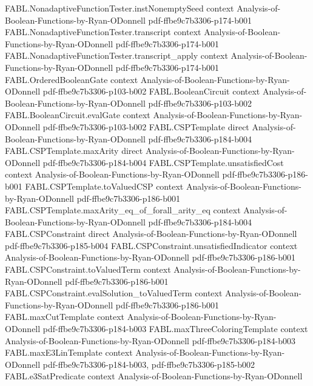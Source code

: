 \begin{theorem}
  {FABL.NonadaptiveFunctionTester.instNonemptySeed}
  {context}
  {Analysis-of-Boolean-Functions-by-Ryan-ODonnell}
  {pdf-ffbe9c7b3306-p174-b001}
\proofstep
  {FABL.NonadaptiveFunctionTester.transcript}
  {context}
  {Analysis-of-Boolean-Functions-by-Ryan-ODonnell}
  {pdf-ffbe9c7b3306-p174-b001}
\proofstep
  {FABL.NonadaptiveFunctionTester.transcript_apply}
  {context}
  {Analysis-of-Boolean-Functions-by-Ryan-ODonnell}
  {pdf-ffbe9c7b3306-p174-b001}
\proofstep
  {FABL.OrderedBooleanGate}
  {context}
  {Analysis-of-Boolean-Functions-by-Ryan-ODonnell}
  {pdf-ffbe9c7b3306-p103-b002}
\proofstep
  {FABL.BooleanCircuit}
  {context}
  {Analysis-of-Boolean-Functions-by-Ryan-ODonnell}
  {pdf-ffbe9c7b3306-p103-b002}
\proofstep
  {FABL.BooleanCircuit.evalGate}
  {context}
  {Analysis-of-Boolean-Functions-by-Ryan-ODonnell}
  {pdf-ffbe9c7b3306-p103-b002}
\proofstep
  {FABL.CSPTemplate}
  {direct}
  {Analysis-of-Boolean-Functions-by-Ryan-ODonnell}
  {pdf-ffbe9c7b3306-p184-b004}
\proofstep
  {FABL.CSPTemplate.maxArity}
  {direct}
  {Analysis-of-Boolean-Functions-by-Ryan-ODonnell}
  {pdf-ffbe9c7b3306-p184-b004}
\proofstep
  {FABL.CSPTemplate.unsatisfiedCost}
  {context}
  {Analysis-of-Boolean-Functions-by-Ryan-ODonnell}
  {pdf-ffbe9c7b3306-p186-b001}
\proofstep
  {FABL.CSPTemplate.toValuedCSP}
  {context}
  {Analysis-of-Boolean-Functions-by-Ryan-ODonnell}
  {pdf-ffbe9c7b3306-p186-b001}
\proofstep
  {FABL.CSPTemplate.maxArity_eq_of_forall_arity_eq}
  {context}
  {Analysis-of-Boolean-Functions-by-Ryan-ODonnell}
  {pdf-ffbe9c7b3306-p184-b004}
\proofstep
  {FABL.CSPConstraint}
  {direct}
  {Analysis-of-Boolean-Functions-by-Ryan-ODonnell}
  {pdf-ffbe9c7b3306-p185-b004}
\proofstep
  {FABL.CSPConstraint.unsatisfiedIndicator}
  {context}
  {Analysis-of-Boolean-Functions-by-Ryan-ODonnell}
  {pdf-ffbe9c7b3306-p186-b001}
\proofstep
  {FABL.CSPConstraint.toValuedTerm}
  {context}
  {Analysis-of-Boolean-Functions-by-Ryan-ODonnell}
  {pdf-ffbe9c7b3306-p186-b001}
\proofstep
  {FABL.CSPConstraint.evalSolution_toValuedTerm}
  {context}
  {Analysis-of-Boolean-Functions-by-Ryan-ODonnell}
  {pdf-ffbe9c7b3306-p186-b001}
\proofstep
  {FABL.maxCutTemplate}
  {context}
  {Analysis-of-Boolean-Functions-by-Ryan-ODonnell}
  {pdf-ffbe9c7b3306-p184-b003}
\proofstep
  {FABL.maxThreeColoringTemplate}
  {context}
  {Analysis-of-Boolean-Functions-by-Ryan-ODonnell}
  {pdf-ffbe9c7b3306-p184-b003}
\proofstep
  {FABL.maxE3LinTemplate}
  {context}
  {Analysis-of-Boolean-Functions-by-Ryan-ODonnell}
  {pdf-ffbe9c7b3306-p184-b003,
    pdf-ffbe9c7b3306-p185-b002}
\proofstep
  {FABL.e3SatPredicate}
  {context}
  {Analysis-of-Boolean-Functions-by-Ryan-ODonnell}

\end{theorem}
